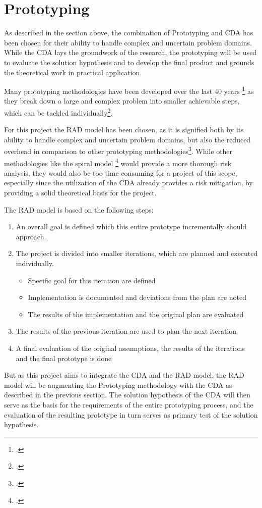 \section{Prototyping}

As described in the section above, the combination of Prototyping and \ac{CDA} has been chosen for their ability to handle complex and uncertain problem domains.
While the \ac{CDA} lays the groundwork of the research, the prototyping will be used to evaluate the solution hypothesis and to develop the final product
and grounds the theoretical work in practical application.

Many prototyping methodologies have been developed over the last 40 years \footcite{gomaaImpactRapidPrototyping1983} as they
break down a large and complex problem into smaller achievable steps, which can be tackled individually\footcite{naumannPrototypingNewParadigm1982}.

For this project the \ac{RAD} model has been chosen, as it is signified both by its ability to handle complex and uncertain problem domains,
but also the reduced overhead in comparison to other prototyping methodologies\footcite{martinRapidApplicationDevelopment1991}.
While other methodologies like the spiral model \footcite{boehmSpiralModelSoftware1988} would provide a more thorough risk analysis,
they would also be too time-consuming for a project of this scope, especially since the utilization of the \ac{CDA} already provides a risk mitigation,
by providing a solid theoretical basis for the project.

The \ac{RAD} model is based on the following steps:

\begin{enumerate}
    \item An overall goal is defined which this entire prototype incrementally should approach.
    \item The project is divided into smaller iterations, which are planned and executed individually.
          \begin{itemize}
              \item Specific goal for this iteration are defined
              \item Implementation is documented and deviations from the plan are noted
              \item The results of the implementation and the original plan are evaluated
          \end{itemize}
    \item The results of the previous iteration are used to plan the next iteration
    \item A final evaluation of the original assumptions, the results of the iterations and the final prototype is done
\end{enumerate}

But as this project aims to integrate the \ac{CDA} and the \ac{RAD} model,
the \ac{RAD} model will be augmenting the Prototyping methodology with the \ac{CDA} as described in the previous section.
The solution hypothesis of the \ac{CDA} will then serve as the basis for the requirements of the entire prototyping process,
and the evaluation of the resulting prototype in turn serves as primary test of the solution hypothesis.

\pagebreak
